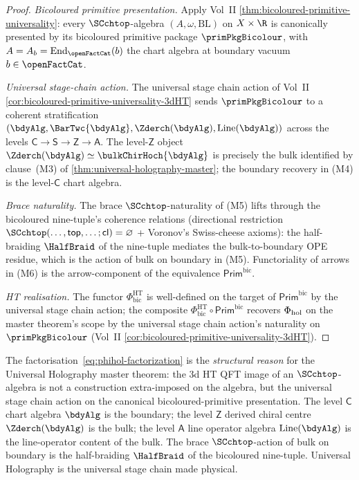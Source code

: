 \begin{proof}
\emph{Bicoloured primitive presentation.}
Apply Vol~II
\cref{thm:bicoloured-primitive-universality}: every
$\SCchtop$-algebra $(A, \omega, \mathrm{BL})$ on $X \times \R$ is
canonically presented by its bicoloured primitive package
$\primPkgBicolour$, with $A = A_b = \mathrm{End}_{\openFactCat}(b)$
the chart algebra at boundary vacuum $b \in \openFactCat$.

\emph{Universal stage-chain action.}
The universal stage chain action of Vol~II
\cref{cor:bicoloured-primitive-universality-3dHT} sends
$\primPkgBicolour$ to a coherent stratification
$(\bdyAlg, \BarTwc{\bdyAlg}, \Zderch(\bdyAlg), \mathrm{Line}(\bdyAlg))$
across the levels $\mathsf{C} \to \mathsf{S} \to \mathsf{Z} \to \mathsf{A}$.
The level-$\mathsf{Z}$ object $\Zderch(\bdyAlg) \simeq
\bulkChirHoch{\bdyAlg}$ is precisely the bulk identified by
clause~(M3) of \cref{thm:universal-holography-master}; the
boundary recovery in (M4) is the level-$\mathsf{C}$ chart algebra.

\emph{Brace naturality.}
The brace $\SCchtop$-naturality of (M5) lifts
through the bicoloured nine-tuple's coherence relations
\textup(directional restriction $\SCchtop(\ldots, \mathsf{top}, \ldots; \mathsf{cl})
= \varnothing$ + Voronov's Swiss-cheese axioms\textup): the
half-braiding $\HalfBraid$ of the nine-tuple mediates the
bulk-to-boundary OPE residue, which is the action of bulk on
boundary in (M5). Functoriality of arrows in (M6) is the
arrow-component of the equivalence
$\mathsf{Prim}^{\mathrm{bic}}$.

\emph{HT realisation.}
The functor
$\Phi^{\mathrm{HT}}_{\mathrm{bic}}$ is well-defined on the
target of $\mathsf{Prim}^{\mathrm{bic}}$ by the universal stage
chain action; the composite $\Phi^{\mathrm{HT}}_{\mathrm{bic}}
\circ \mathsf{Prim}^{\mathrm{bic}}$ recovers $\Phi_{\mathrm{hol}}$ on the
master theorem's scope by the universal stage chain action's
naturality on $\primPkgBicolour$ \textup(Vol~II
\cref{cor:bicoloured-primitive-universality-3dHT}\textup).
\end{proof}

\begin{remark}
\label{rem:phihol-factorization-architectural}
The factorisation~\eqref{eq:phihol-factorization} is the
\emph{structural reason} for the Universal Holography master
theorem: the $3$d HT QFT image of an $\SCchtop$-algebra is not a
construction extra-imposed on the algebra, but the universal stage
chain action on the canonical bicoloured-primitive presentation.
The level $\mathsf{C}$ chart algebra $\bdyAlg$ is the boundary; the
level $\mathsf{Z}$ derived chiral centre $\Zderch(\bdyAlg)$ is the
bulk; the level $\mathsf{A}$ line operator algebra
$\mathrm{Line}(\bdyAlg)$ is the line-operator content of the bulk.
The brace $\SCchtop$-action of bulk on boundary is the
half-braiding $\HalfBraid$ of the bicoloured nine-tuple. Universal
Holography is the universal stage chain made physical.
\end{remark}

